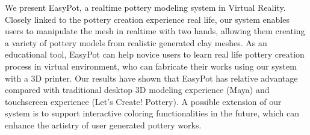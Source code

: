 \documentclass{svjour3}                     %
\begin{document}
We present EasyPot, a realtime pottery modeling system in Virtual Reality.
Closely linked to the pottery creation experience real life, our system enables users to manipulate the mesh in realtime with two hands, allowing them creating a variety of pottery models from realistic generated clay meshes.
As an educational tool, EasyPot can help novice users to learn real life pottery creation process in virtual environment, who can fabricate their works using our system with a 3D printer.
Our results have shown that EasyPot has relative advantage compared with traditional desktop 3D modeling experience (Maya) and touchscreen experience (Let's Create! Pottery).
A possible extension of our system is to support interactive coloring functionalities in the future, which can enhance the artistry of user generated pottery works.


\begin{acknowledgements}
\end{acknowledgements}


%
%
\end{document}
